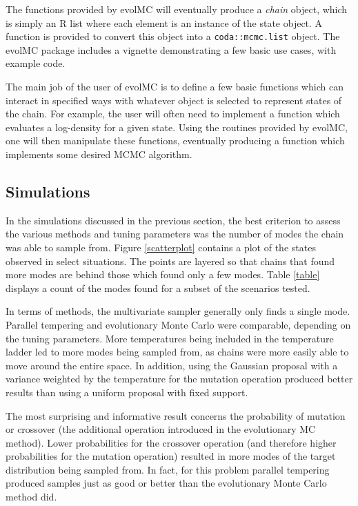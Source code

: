 \documentclass[12pt]{article}\usepackage[]{graphicx}\usepackage[]{color}
\begin{document}
The functions provided by evolMC will eventually produce a
\emph{chain} object, which is simply an R list where each element is
an instance of the state object. A function is provided to convert
this object into a {\tt coda::mcmc.list} object. The evolMC package
includes a vignette demonstrating a few basic use cases, with example
code.


The main job of the user of evolMC is to define a few basic functions
which can interact in specified ways with whatever object is selected
to represent states of the chain. For example, the user will often
need to implement a function which evaluates a log-density for a given
state. Using the routines provided by evolMC, one will then manipulate
these functions, eventually producing a function which implements some
desired MCMC algorithm.


\subsection{Simulations}
\label{sec:simulations}

In the simulations discussed in the previous section, the best
criterion to assess the various methods and tuning parameters was the
number of modes the chain was able to sample from.  Figure
\ref{scatterplot} contains a plot of the states observed in select
situations. The points are layered so that chains that found more
modes are behind those which found only a few modes. Table \ref{table}
displays a count of the modes found for a subset of the scenarios
tested. 

In terms of methods, the multivariate sampler generally only finds a
single mode.  Parallel tempering and evolutionary Monte Carlo were
comparable, depending on the tuning parameters.  More temperatures
being included in the temperature ladder led to more modes being
sampled from, as chains were more easily able to move around the
entire space.  In addition, using the Gaussian proposal with a
variance weighted by the temperature for the mutation operation
produced better results than using a uniform proposal with fixed
support.

The most surprising and informative result concerns the probability of
mutation or crossover (the additional operation introduced in the
evolutionary MC method).  Lower probabilities for the crossover
operation (and therefore higher probabilities for the mutation
operation) resulted in more modes of the target distribution being
sampled from.  In fact, for this problem parallel tempering produced
samples just as good or better than the evolutionary Monte Carlo
method did.
\end{document}
